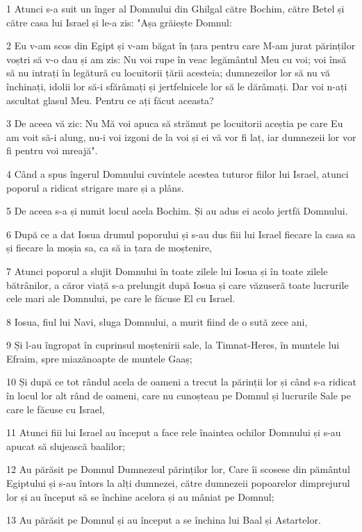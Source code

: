 \par 1 Atunci s-a suit un înger al Domnului din Ghilgal către Bochim, către Betel și către casa lui Israel și le-a zis: "Așa grăiește Domnul:
\par 2 Eu v-am scos din Egipt și v-am băgat în țara pentru care M-am jurat părinților voștri să v-o dau și am zis: Nu voi rupe în veac legământul Meu cu voi; voi însă să nu intrați în legătură cu locuitorii țării acesteia; dumnezeilor lor să nu vă închinați, idolii lor să-i sfărâmați și jertfelnicele lor să le dărâmați. Dar voi n-ați ascultat glasul Meu. Pentru ce ați făcut aceasta?
\par 3 De aceea vă zic: Nu Mă voi apuca să strămut pe locuitorii aceștia pe care Eu am voit să-i alung, nu-i voi izgoni de la voi și ei vă vor fi laț, iar dumnezeii lor vor fi pentru voi mreajă".
\par 4 Când a spus îngerul Domnului cuvintele acestea tuturor fiilor lui Israel, atunci poporul a ridicat strigare mare și a plâns.
\par 5 De aceea s-a și numit locul acela Bochim. Și au adus ei acolo jertfă Domnului.
\par 6 După ce a dat Iosua drumul poporului și s-au dus fiii lui Israel fiecare la casa sa și fiecare la moșia sa, ca să ia țara de moștenire,
\par 7 Atunci poporul a slujit Domnului în toate zilele lui Iosua și în toate zilele bătrânilor, a căror viață s-a prelungit după Iosua și care văzuseră toate lucrurile cele mari ale Domnului, pe care le făcuse El cu Israel.
\par 8 Iosua, fiul lui Navi, sluga Domnului, a murit fiind de o sută zece ani,
\par 9 Și l-au îngropat în cuprinsul moștenirii sale, la Timnat-Heres, în muntele lui Efraim, spre miazănoapte de muntele Gaaș;
\par 10 Și după ce tot rândul acela de oameni a trecut la părinții lor și când s-a ridicat în locul lor alt rând de oameni, care nu cunoșteau pe Domnul și lucrurile Sale pe care le făcuse cu Israel,
\par 11 Atunci fiii lui Israel au început a face rele înaintea ochilor Domnului și s-au apucat să slujească baalilor;
\par 12 Au părăsit pe Domnul Dumnezeul părinților lor, Care îi scosese din pământul Egiptului și s-au întors la alți dumnezei, către dumnezeii popoarelor dimprejurul lor și au început să se închine acelora și au mâniat pe Domnul;
\par 13 Au părăsit pe Domnul și au început a se închina lui Baal și Astartelor.
